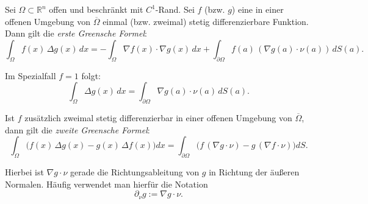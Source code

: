 \documentclass[11pt, a4paper]{article}
\begin{document}
\begin{lemma}
 Sei $\Omega \subset \mathbb{R}^n$ offen und beschränkt mit $C^1$-Rand.  
Sei $f$ (bzw. $g$) eine in einer offenen Umgebung von $\overline{\Omega}$ einmal (bzw. zweimal) stetig differenzierbare Funktion. Dann gilt die \emph{erste Greensche Formel}:
\[
\int_{\Omega} f(x) \, \Delta g(x) \, dx
=
- \int_{\Omega} \nabla f(x) \cdot \nabla g(x) \, dx
+ \int_{\partial \Omega} f(a) \, (\nabla g(a) \cdot \nu(a)) \, dS(a).
\]

Im Spezialfall $f = 1$ folgt:
\[
\int_{\Omega} \Delta g(x) \, dx
=
\int_{\partial \Omega} \nabla g(a) \cdot \nu(a) \, dS(a).
\]

Ist $f$ zusätzlich zweimal stetig differenzierbar in einer offenen Umgebung von $\overline{\Omega}$, 
dann gilt die \emph{zweite Greensche Formel}:
\[
\int_{\Omega} \bigl( f(x) \, \Delta g(x) - g(x) \, \Delta f(x) \bigr) dx
=
\int_{\partial \Omega} \bigl( f \, (\nabla g \cdot \nu) - g \, (\nabla f \cdot \nu) \bigr) dS.
\]

\end{lemma}


\begin{note}

Hierbei ist $\nabla g \cdot \nu$ gerade die Richtungsableitung von $g$ in Richtung der äußeren Normalen.  
Häufig verwendet man hierfür die Notation
\[
\partial_\nu g := \nabla g \cdot \nu.
\]
\end{note}
\end{document}
